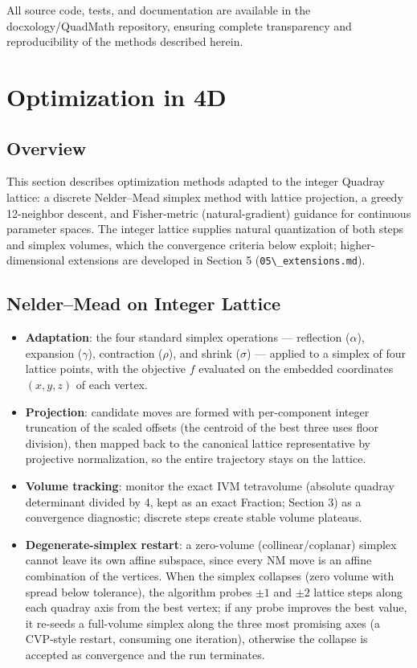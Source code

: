 \documentclass[
  10pt,
]{article}
\newcommand{\passthrough}[1]{#1}
\providecommand{\tightlist}{%
  \setlength{\itemsep}{0pt}\setlength{\parskip}{0pt}}
\begin{document}
All source code, tests, and documentation are available in the
docxology/QuadMath repository, ensuring complete transparency and
reproducibility of the methods described herein.

\newpage

\section{Optimization in 4D}\label{optimization-in-4d}

\subsection{Overview}\label{overview-2}

This section describes optimization methods adapted to the integer
Quadray lattice: a discrete Nelder--Mead simplex method with lattice
projection, a greedy 12-neighbor descent, and Fisher-metric
(natural-gradient) guidance for continuous parameter spaces. The integer
lattice supplies natural quantization of both steps and simplex volumes,
which the convergence criteria below exploit; higher-dimensional
extensions are developed in Section 5
(\passthrough{\lstinline!05\_extensions.md!}).

\subsection{Nelder--Mead on Integer
Lattice}\label{neldermead-on-integer-lattice}

\begin{itemize}
\tightlist
\item
  \textbf{Adaptation}: the four standard simplex operations ---
  reflection (\(\alpha\)), expansion (\(\gamma\)), contraction
  (\(\rho\)), and shrink (\(\sigma\)) --- applied to a simplex of four
  lattice points, with the objective \(f\) evaluated on the embedded
  coordinates \((x, y, z)\) of each vertex.
\item
  \textbf{Projection}: candidate moves are formed with per-component
  integer truncation of the scaled offsets (the centroid of the best
  three uses floor division), then mapped back to the canonical lattice
  representative by projective normalization, so the entire trajectory
  stays on the lattice.
\item
  \textbf{Volume tracking}: monitor the exact IVM tetravolume (absolute
  quadray determinant divided by 4, kept as an exact Fraction; Section
  3) as a convergence diagnostic; discrete steps create stable volume
  plateaus.
\item
  \textbf{Degenerate-simplex restart}: a zero-volume
  (collinear/coplanar) simplex cannot leave its own affine subspace,
  since every NM move is an affine combination of the vertices. When the
  simplex collapses (zero volume with spread below tolerance), the
  algorithm probes \(\pm 1\) and \(\pm 2\) lattice steps along each
  quadray axis from the best vertex; if any probe improves the best
  value, it re-seeds a full-volume simplex along the three most
  promising axes (a CVP-style restart, consuming one iteration),
  otherwise the collapse is accepted as convergence and the run
  terminates.
\end{itemize}
\end{document}
